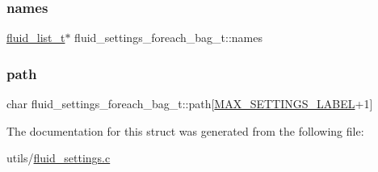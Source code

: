 \subsubsection{\texorpdfstring{names}{names}}
{\footnotesize\ttfamily \hyperlink{fluid__list_8h_a3ef7535d4290862c0af118569223bd89}{fluid\+\_\+list\+\_\+t}$\ast$ fluid\+\_\+settings\+\_\+foreach\+\_\+bag\+\_\+t\+::names}

\mbox{\label{structfluid__settings__foreach__bag__t_ad85766a3a1a8c5d9b442ad68d689d9e0}} 
\subsubsection{\texorpdfstring{path}{path}}
{\footnotesize\ttfamily char fluid\+\_\+settings\+\_\+foreach\+\_\+bag\+\_\+t\+::path\mbox{[}\hyperlink{fluid__settings_8c_aecc2a070ed71497d75256b5c7704593d}{M\+A\+X\+\_\+\+S\+E\+T\+T\+I\+N\+G\+S\+\_\+\+L\+A\+B\+EL}+1\mbox{]}}



The documentation for this struct was generated from the following file\+:\begin{DoxyCompactItemize}
\item 
utils/\hyperlink{fluid__settings_8c}{fluid\+\_\+settings.\+c}\end{DoxyCompactItemize}
